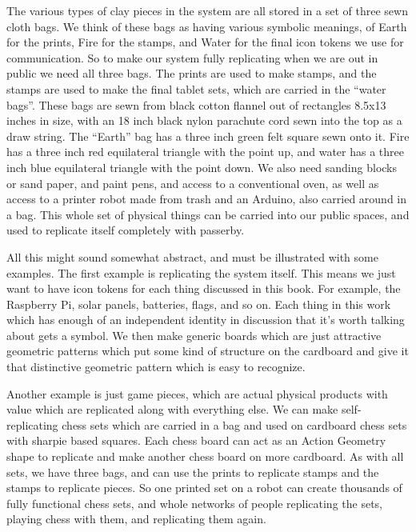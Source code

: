 The various types of clay pieces in the system are all stored in a set
of three sewn cloth bags. We think of these bags as having various
symbolic meanings, of Earth for the prints, Fire for the stamps, and
Water for the final icon tokens we use for communication. So to make our
system fully replicating when we are out in public we need all three
bags. The prints are used to make stamps, and the stamps are used to
make the final tablet sets, which are carried in the ``water bags''.
These bags are sewn from black cotton flannel out of rectangles 8.5x13
inches in size, with an 18 inch black nylon parachute cord sewn into the
top as a draw string. The ``Earth'' bag has a three inch green felt
square sewn onto it. Fire has a three inch red equilateral triangle with
the point up, and water has a three inch blue equilateral triangle with
the point down. We also need sanding blocks or sand paper, and paint
pens, and access to a conventional oven, as well as access to a printer
robot made from trash and an Arduino, also carried around in a bag. This
whole set of physical things can be carried into our public spaces, and
used to replicate itself completely with passerby.

All this might sound somewhat abstract, and must be illustrated with
some examples. The first example is replicating the system itself. This
means we just want to have icon tokens for each thing discussed in this
book. For example, the Raspberry Pi, solar panels, batteries, flags, and
so on. Each thing in this work which has enough of an independent
identity in discussion that it's worth talking about gets a symbol. We
then make generic boards which are just attractive geometric patterns
which put some kind of structure on the cardboard and give it that
distinctive geometric pattern which is easy to recognize.

Another example is just game pieces, which are actual physical products
with value which are replicated along with everything else. We can make
self-replicating chess sets which are carried in a bag and used on
cardboard chess sets with sharpie based squares. Each chess board can
act as an Action Geometry shape to replicate and make another chess
board on more cardboard. As with all sets, we have three bags, and can
use the prints to replicate stamps and the stamps to replicate pieces.
So one printed set on a robot can create thousands of fully functional
chess sets, and whole networks of people replicating the sets, playing
chess with them, and replicating them again.

